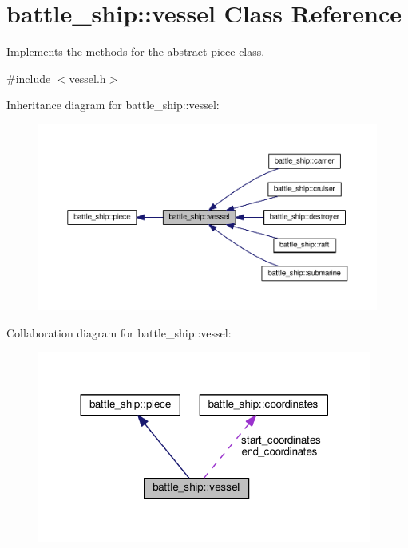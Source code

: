 \hypertarget{classbattle__ship_1_1vessel}{}\section{battle\+\_\+ship\+:\+:vessel Class Reference}
\label{classbattle__ship_1_1vessel}


Implements the methods for the abstract piece class.  




{\ttfamily \#include $<$vessel.\+h$>$}



Inheritance diagram for battle\+\_\+ship\+:\+:vessel\+:
\nopagebreak
\begin{figure}[H]
\begin{center}
\leavevmode
\includegraphics[width=350pt]{classbattle__ship_1_1vessel__inherit__graph}
\end{center}
\end{figure}


Collaboration diagram for battle\+\_\+ship\+:\+:vessel\+:
\nopagebreak
\begin{figure}[H]
\begin{center}
\leavevmode
\includegraphics[width=312pt]{classbattle__ship_1_1vessel__coll__graph}
\end{center}
\end{figure}
